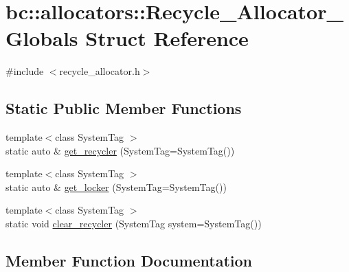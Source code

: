 \hypertarget{structbc_1_1allocators_1_1Recycle__Allocator__Globals}{}\section{bc\+:\+:allocators\+:\+:Recycle\+\_\+\+Allocator\+\_\+\+Globals Struct Reference}
\label{structbc_1_1allocators_1_1Recycle__Allocator__Globals}


{\ttfamily \#include $<$recycle\+\_\+allocator.\+h$>$}

\subsection*{Static Public Member Functions}
\begin{DoxyCompactItemize}
\item 
{\footnotesize template$<$class System\+Tag $>$ }\\static auto \& \hyperlink{structbc_1_1allocators_1_1Recycle__Allocator__Globals_a57ce3fa38180df102b12cc19a7c78ec2}{get\+\_\+recycler} (System\+Tag=System\+Tag())
\item 
{\footnotesize template$<$class System\+Tag $>$ }\\static auto \& \hyperlink{structbc_1_1allocators_1_1Recycle__Allocator__Globals_abece94e00f4008b14c29aadafd90570e}{get\+\_\+locker} (System\+Tag=System\+Tag())
\item 
{\footnotesize template$<$class System\+Tag $>$ }\\static void \hyperlink{structbc_1_1allocators_1_1Recycle__Allocator__Globals_afd6c9abf395346ce63dacbad3d57e3b5}{clear\+\_\+recycler} (System\+Tag system=System\+Tag())
\end{DoxyCompactItemize}


\subsection{Member Function Documentation}
\mbox{\label{structbc_1_1allocators_1_1Recycle__Allocator__Globals_afd6c9abf395346ce63dacbad3d57e3b5}} 
